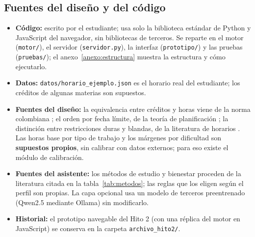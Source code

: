 \subsection{Fuentes del diseño y del código}

\begin{itemize}
    \item \textbf{Código:} escrito por el estudiante; usa solo la biblioteca estándar de Python y JavaScript del navegador, sin bibliotecas de terceros. Se reparte en el motor (\texttt{motor/}), el servidor (\texttt{servidor.py}), la interfaz (\texttt{prototipo/}) y las pruebas (\texttt{pruebas/}); el anexo~\ref{anexo:estructura} muestra la estructura y cómo ejecutarlo.
    \item \textbf{Datos:} \texttt{datos/horario\_ejemplo.json} es el horario real del estudiante; los créditos de algunas materias son supuestos.
    \item \textbf{Fuentes del diseño:} la equivalencia entre créditos y horas viene de la norma colombiana \parencite{MEN2019}; el orden por fecha límite, de la teoría de planificación \parencite{Liu1973,Russell2021}; la distinción entre restricciones duras y blandas, de la literatura de horarios \parencite{Schaerf1999}. Las horas base por tipo de trabajo y los márgenes por dificultad son \textbf{supuestos propios}, sin calibrar con datos externos; para eso existe el módulo de calibración.
    \item \textbf{Fuentes del asistente:} los métodos de estudio y bienestar proceden de la literatura citada en la tabla~\ref{tab:metodos}; las reglas que los eligen según el perfil son propias. La capa opcional usa un modelo de terceros preentrenado (Qwen2.5 mediante Ollama) sin modificarlo.
    \item \textbf{Historial:} el prototipo navegable del Hito 2 (con una réplica del motor en JavaScript) se conserva en la carpeta \texttt{archivo\_hito2/}.
\end{itemize}
